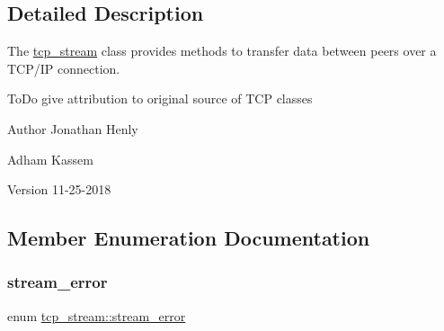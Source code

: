 \subsection{Detailed Description}
The \hyperlink{classtcp__stream}{tcp\+\_\+stream} class provides methods to transfer data between peers over a T\+C\+P/\+IP connection.

To\+Do give attribution to original source of T\+CP classes

\begin{DoxyAuthor}{Author}
Jonathan Henly 

Adham Kassem 
\end{DoxyAuthor}
\begin{DoxyVersion}{Version}
11-\/25-\/2018 
\end{DoxyVersion}


\subsection{Member Enumeration Documentation}
\mbox{\label{classtcp__stream_a1654b581bd89eacae6c5c00bf44bd303}} 
\subsubsection{\texorpdfstring{stream\+\_\+error}{stream\_error}}
{\footnotesize\ttfamily enum \hyperlink{classtcp__stream_a1654b581bd89eacae6c5c00bf44bd303}{tcp\+\_\+stream\+::stream\+\_\+error}}

